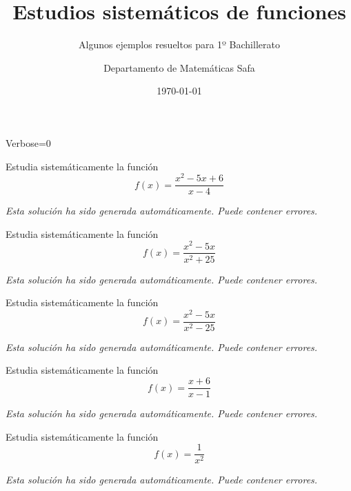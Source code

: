 \documentclass[nochap,palatino,nobuilddate]{estudioFuncion}
\title{Estudios sistemáticos de funciones}
\author{Departamento de Matemáticas Safa}
\date{\today}
\subtitle{Algunos ejemplos resueltos para 1º Bachillerato}
\newif\ifverbose
\begin{document}

\ifverbose
	\begin{sagesilent}
		Verbose=1
	\end{sagesilent}
\else
	\begin{sagesilent}
		Verbose=0
	\end{sagesilent}
\fi


\maketitle






\begin{problem} Estudia sistemáticamente la función
	\[
		f(x)=\frac{x^2-5x+6}{x-4}
	\]
\solution

\textit{Esta solución ha sido generada automáticamente. Puede contener errores.}


\end{problem}


\begin{problem} Estudia sistemáticamente la función
	\[
		f(x)=\frac{x^2-5x}{x^2+25}
	\]
\solution

\textit{Esta solución ha sido generada automáticamente. Puede contener errores.}


\end{problem}

\begin{problem} Estudia sistemáticamente la función
	\[
		f(x)=\frac{x^2-5x}{x^2-25}
	\]
\solution

\textit{Esta solución ha sido generada automáticamente. Puede contener errores.}


\end{problem}


\begin{problem} Estudia sistemáticamente la función
	\[
		f(x)=\frac{x+6}{x-1}
	\]
\solution

\textit{Esta solución ha sido generada automáticamente. Puede contener errores.}


\end{problem}

\begin{problem} Estudia sistemáticamente la función
	\[
		f(x)=\frac{1}{x^2}
	\]
\solution

\textit{Esta solución ha sido generada automáticamente. Puede contener errores.}


\end{problem}
\end{document}
